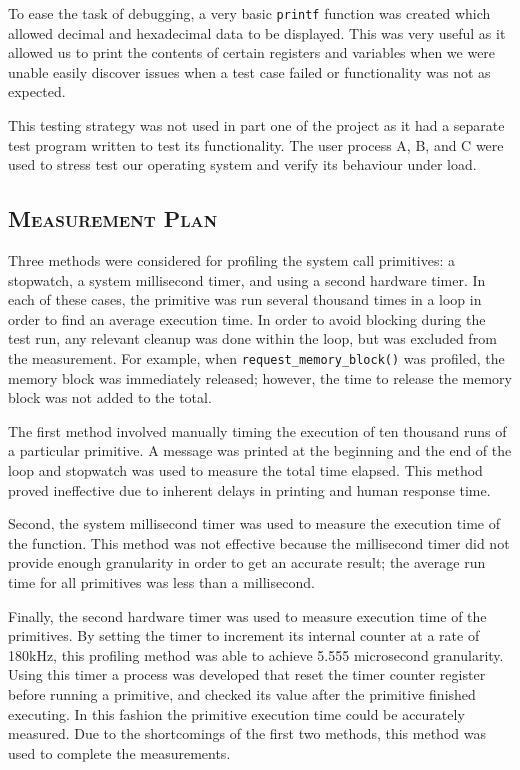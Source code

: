 \documentclass[oneside]{report}
\begin{document}
To ease the task of debugging, a very basic \texttt{printf} function 
was created which allowed decimal and hexadecimal data to be displayed. This 
was very useful as it allowed us to print the contents of certain registers and 
variables when we were unable easily discover issues when a test case failed or 
functionality was not as expected. 

This testing strategy was not used in part one of the project as it had a 
separate test program written to test its functionality. The user process A, B, 
and C were used to stress test our operating system and verify its behaviour 
under load. 

\subsection{\textsc{Measurement Plan}}
\label{measurementplan}

Three methods were considered for profiling the system call
primitives: a stopwatch, a system millisecond timer, and using a second
hardware timer. In each of these cases, the primitive was run several
thousand times in a loop in order to find an average execution
time. In order to avoid blocking during the test run, any relevant
cleanup was done within the loop, but was excluded from the
measurement. For example, when \texttt{request\_memory\_block()} was
profiled, the memory block was immediately released; however, the time
to release the memory block was not added to the total.

The first method involved manually timing the execution of ten
thousand runs of a particular primitive. A message was printed at the
beginning and the end of the loop and stopwatch was used to measure
the total time elapsed. This method proved ineffective due to inherent
delays in printing and human response time.

Second, the system millisecond timer was used to measure the execution
time of the function. This method was not effective because the
millisecond timer did not provide enough granularity in order to get
an accurate result; the average run time for all primitives was less than a
millisecond.

Finally, the second hardware timer was used to measure execution time
of the primitives. By setting the timer to increment its internal
counter at a rate of 180kHz, this profiling method was able to achieve
5.555 microsecond granularity. Using this timer a process was
developed that reset the timer counter register before running a
primitive, and checked its value after the primitive finished
executing. In this fashion the primitive execution time could be
accurately measured. Due to the shortcomings of the first two methods,
this method was used to complete the measurements.
\end{document}
